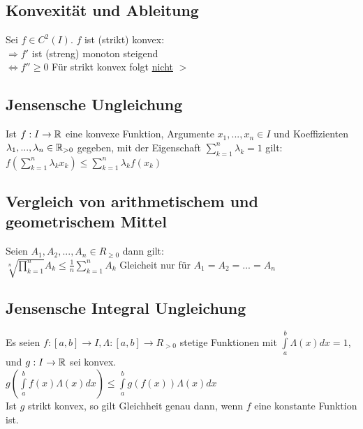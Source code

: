 \documentclass[german]{latex4ei/latex4ei_sheet}
\begin{document}
\begin{sectionbox}
	\subsection{Konvexität und Ableitung}
	Sei $f \in C^2(I)$. $f$ ist (strikt) konvex:\\
	$\Rightarrow f'$ ist (streng) monoton steigend\\
	$\Leftrightarrow f'' \ge 0$ Für strikt konvex folgt \underline{nicht} $>$

\end{sectionbox}

\begin{sectionbox}
	\subsection{Jensensche Ungleichung}
	Ist $f: I \rightarrow \operatorname{\mathbb R}$ eine konvexe Funktion, Argumente $x_1,...,x_n \in I$ und Koeffizienten $\lambda_1,...,\lambda_n \in  \operatorname{\mathbb R}_{>0}$ gegeben, mit der Eigenschaft  $\sum \limits_{k=1}^{n} \lambda_k = 1$ gilt:\\
	$f(\sum \limits_{k=1}^{n} \lambda_k x_k)\le \sum \limits_{k=1}^{n} \lambda_k f(x_k) $

\end{sectionbox}



\begin{sectionbox}
	\subsection{Vergleich von arithmetischem und geometrischem Mittel}
	Seien $A_1, A_2, . . . , A_n \in R_{ \ge 0}$ dann gilt:\\
	$\sqrt[n]{\prod \limits_{k=1}^{n}} A_k \le \frac{1}{n} \sum \limits_{k=1}^{n} A_k$ Gleicheit nur für $A_1=A_2=...=A_n$

\end{sectionbox}

\begin{sectionbox}
	\subsection{Jensensche Integral Ungleichung}

	Es seien $f : [a, b] \rightarrow I , \Lambda : [a, b] \rightarrow R_{>0}$ stetige Funktionen mit  $ \int \limits_{a}^{b} \Lambda(x) dx = 1$, und $g : I \rightarrow \operatorname{\mathbb R}$ sei konvex.\\
	$g(\int \limits_{a}^{b}f(x)\Lambda (x)dx) \le \int \limits_{a}^{b}g(f(x))\Lambda (x)dx$\\
	Ist $g$ strikt konvex, so gilt Gleichheit genau dann, wenn $f$ eine konstante Funktion ist.
\end{sectionbox}
\end{document}
